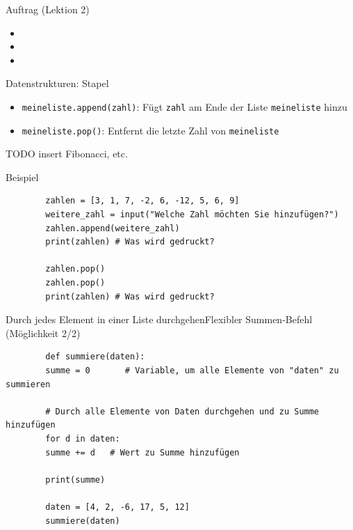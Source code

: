 \begin{frame}[fragile]{Auftrag (Lektion 2)}
	\begin{itemize}
		\item {}
		\item {}
		\item {}
	\end{itemize}
\end{frame}

\begin{frame}[fragile]{Datenstrukturen: Stapel }
	\begin{itemize}
		\item \lstinline|meineliste.append(zahl)|: Fügt \lstinline|zahl| am Ende der Liste \lstinline|meineliste| hinzu
		\item \lstinline|meineliste.pop()|: Entfernt die letzte Zahl von \lstinline|meineliste|
	\end{itemize}
	TODO insert Fibonacci, etc.
\end{frame}

\begin{frame}[fragile]{Beispiel}
	\begin{lstlisting}
		zahlen = [3, 1, 7, -2, 6, -12, 5, 6, 9]
		weitere_zahl = input("Welche Zahl möchten Sie hinzufügen?")
		zahlen.append(weitere_zahl)
		print(zahlen) # Was wird gedruckt?
		
		zahlen.pop()
		zahlen.pop()
		print(zahlen) # Was wird gedruckt?
	\end{lstlisting}
	
\end{frame}

\begin{frame}[fragile]{Durch jedes Element in einer Liste durchgehen}{Flexibler Summen-Befehl (Möglichkeit 2/2)}
	\begin{lstlisting}
		def summiere(daten):
		summe = 0       # Variable, um alle Elemente von "daten" zu summieren
		
		# Durch alle Elemente von Daten durchgehen und zu Summe hinzufügen
		for d in daten:
		summe += d   # Wert zu Summe hinzufügen
		
		print(summe)
		
		daten = [4, 2, -6, 17, 5, 12] 
		summiere(daten)
	\end{lstlisting}
\end{frame}

